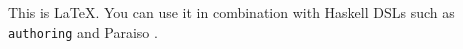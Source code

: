 \documentclass{article}
\begin{document}
This is \LaTeX. You can use it in combination with Haskell DSLs such as {\tt authoring}
and Paraiso
\cite{Muranushi2012Paraiso} .



\end{document}
